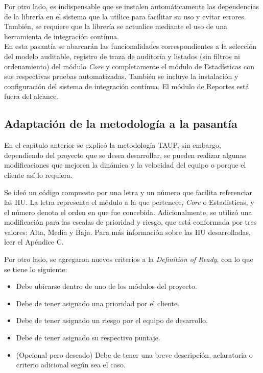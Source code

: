 Por otro lado, es indispensable que se instalen automáticamente las dependencias de la librería en el sistema que la utilice para facilitar su uso y evitar errores. También, se requiere que la librería se actualice mediante el uso de una herramienta de integración contínua. \\

En esta pasantía se abarcarán las funcionalidades correspondientes a la selección del modelo auditable, registro de traza de auditoría y listados (sin filtros ni ordenamiento) del módulo \textit{Core} y completamente el módulo de Estadísticas con sus respectivas pruebas automatizadas. También se incluye la instalación y configuración del sistema de integración contínua. El módulo de Reportes está fuera del alcance.

\subsection{Adaptación de la metodología a la pasantía}

En el capítulo anterior se explicó la metodología TAUP, sin embargo, dependiendo del proyecto que se desea desarrollar, se pueden realizar algunas modificaciones que mejoren la dinámica y la velocidad del equipo o porque el cliente así lo requiera.

Se ideó un código compuesto por una letra y un número que facilita referenciar las HU. La letra representa el módulo a la que pertenece, \textit{Core} o Estadísticas, y el número denota el orden en que fue concebida. Adicionalmente, se utilizó una modificación  para las escalas de prioridad y riesgo, que está conformada por tres valores: Alta, Media y Baja. Para más información sobre las HU desarrolladas, leer el Apéndice C.

Por otro lado, se agregaron nuevos criterios a la \textit{Definition of Ready}, con lo que se tiene lo siguiente:

\begin{itemize}
    \item Debe ubicarse dentro de uno de los módulos del proyecto.
    \item Debe de tener asignado una prioridad por el cliente.
    \item Debe de tener asignado un riesgo por el equipo de desarrollo.
    \item Debe de tener asignado su respectivo puntaje.
    \item (Opcional pero deseado) Debe de tener una breve descripción, aclaratoria o criterio adicional según sea el caso.
\end{itemize}


